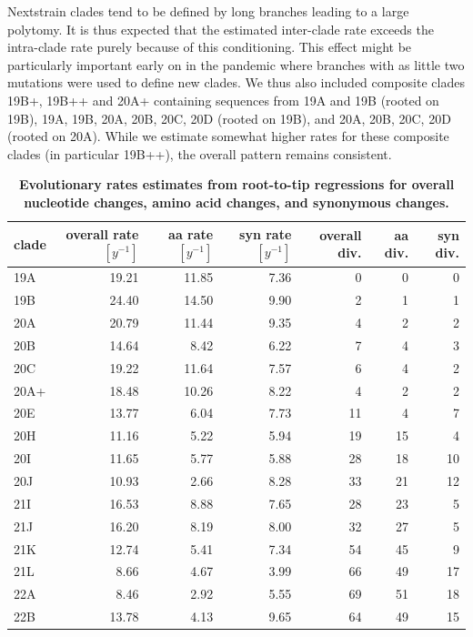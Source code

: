 \documentclass[aps,rmp, twocolumn]{revtex4}
\begin{document}
Nextstrain clades tend to be defined by long branches leading to a large polytomy.
It is thus expected that the estimated inter-clade rate exceeds the intra-clade rate purely because of this conditioning.
This effect might be particularly important early on in the pandemic where branches with as little two mutations were used to define new clades.
We thus also included composite clades 19B+, 19B++ and 20A+ containing sequences from 19A and 19B (rooted on 19B), 19A, 19B, 20A, 20B, 20C, 20D (rooted on 19B), and 20A, 20B, 20C, 20D (rooted on 20A).
While we estimate somewhat higher rates for these composite clades (in particular 19B++), the overall pattern remains consistent.

\begin{table}
\begin{tabular}{l|rrrrrr}
    \hline
    {\bf clade} &  overall rate $[y^{-1}]$ & aa rate $[y^{-1}]$ &  syn rate $[y^{-1}]$ & overall div. &  aa div. &  syn div. \\
    \hline
      19A &     19.21 &   11.85 &     7.36 &     0 &       0 &        0 \\
      19B &     24.40 &   14.50 &     9.90 &     2 &       1 &        1 \\
      20A &     20.79 &   11.44 &     9.35 &     4 &       2 &        2 \\
      20B &     14.64 &    8.42 &     6.22 &     7 &       4 &        3 \\
      20C &     19.22 &   11.64 &     7.57 &     6 &       4 &        2 \\
     20A+ &     18.48 &   10.26 &     8.22 &     4 &       2 &        2 \\
      20E &     13.77 &    6.04 &     7.73 &    11 &       4 &        7 \\
      20H &     11.16 &    5.22 &     5.94 &    19 &      15 &        4 \\
      20I &     11.65 &    5.77 &     5.88 &    28 &      18 &       10 \\
      20J &     10.93 &    2.66 &     8.28 &    33 &      21 &       12 \\
      21I &     16.53 &    8.88 &     7.65 &    28 &      23 &        5 \\
      21J &     16.20 &    8.19 &     8.00 &    32 &      27 &        5 \\
      21K &     12.74 &    5.41 &     7.34 &    54 &      45 &        9 \\
      21L &      8.66 &    4.67 &     3.99 &    66 &      49 &       17 \\
      22A &      8.46 &    2.92 &     5.55 &    69 &      51 &       18 \\
      22B &     13.78 &    4.13 &     9.65 &    64 &      49 &       15 \\
      \hline
    \end{tabular}
\caption{{\bf Evolutionary rates estimates from root-to-tip regressions for overall nucleotide changes, amino acid changes, and synonymous changes.} \label{tab:rates}}
\end{table}
\end{document}
